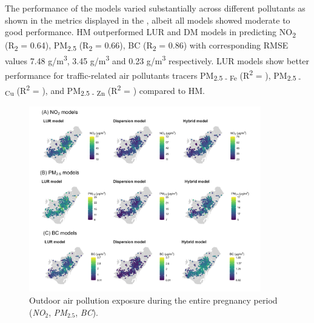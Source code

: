 \documentclass{article}
\begin{document}
The performance of the models varied substantially across different pollutants as shown in the metrics displayed in the , albeit all models showed moderate to good performance. HM outperformed LUR and DM models in predicting  NO\textsubscript{2} (R\textsubscript{2} = 0.64), PM\textsubscript{2.5} (R\textsubscript{2} = 0.66), BC (R\textsubscript{2} = 0.86) with corresponding RMSE values 7.48 \mu\)g/m\textsuperscript{3}, 3.45 \mu\)g/m\textsuperscript{3} and 0.23 \mu\)g/m\textsuperscript{3} respectively. LUR models show better performance for traffic-related air pollutants tracers PM\textsubscript{2.5 - Fe} (R\textsuperscript{2} = ), PM\textsubscript{2.5 - Cu} (R\textsuperscript{2} = ), and PM\textsubscript{2.5 - Zn} (R\textsuperscript{2} = ) compared to HM. 






\captionsetup[figure]{skip=6pt}
\begin{figure}[!htb]
\includegraphics[width=0.9\textwidth]{figures/combined_figure1.png}
\caption{Outdoor air pollution exposure during the entire pregnancy period (\textit{NO$_2$}, \textit{PM$_{2.5}$}, \textit{BC}).}
\label{fig2a}
\end{figure}
\end{document}
